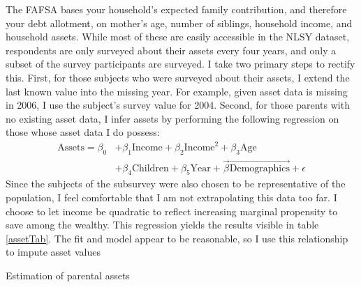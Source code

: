 \documentclass[12pt]{article}
\begin{document}
	The FAFSA bases your household's expected family contribution, and therefore your debt allotment, on mother's age, number of siblings, household income, and household assets. While most of these are easily accessible in the NLSY dataset, respondents are only surveyed about their assets every four years, and only a subset of the survey participants are surveyed. I take two primary steps to rectify this. First, for those subjects who were surveyed about their assets, I extend the last known value into the missing year. For example, given asset data is missing in 2006, I use the subject's survey value for 2004. Second, for those parents with no existing asset data, I infer assets by performing the following regression on those whose asset data I do possess: 
	\begin{equation}
	\begin{aligned}
	\mbox{Assets} = \beta_0 &+ \beta_1 \mbox{Income} + \beta_2 \mbox{Income}^2 + \beta_3 \mbox{Age} \\
	&+ \beta_4 \mbox{Children} + \beta_5 \mbox{Year} + \vec{\beta} \vec{\mbox{Demographics}} + \epsilon
	\end{aligned}
	\end{equation}
	Since the subjects of the subsurvey were also chosen to be representative of the population, I feel comfortable that I am not extrapolating this data too far. I choose to let income be quadratic to reflect increasing marginal propensity to save among the wealthy. This regression yields the results visible in table \ref{assetTab}. The fit and model appear to be reasonable, so I use this relationship to impute asset values
	
	\begin{table}
		\centering
		\caption{Estimation of parental assets}
		
		\label{assetTab}
	\end{table}
\end{document}
